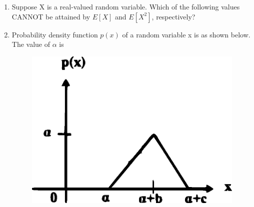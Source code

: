 \begin{enumerate}[label=\thesection.\arabic*.,ref=\thesection.\theenumi]
\begin{enumerate}
\end{enumerate}
\solution



\item Suppose X is a real-valued random variable. Which of the following values CANNOT be attained by $E[X]$ and $E[X^2]$, respectively?

\begin{enumerate}
\end{enumerate}
\solution


\item Probability density function $p(x)$ of a random variable x is as shown below. The value of $\alpha$ is 

\begin{figure}[!h]
\includegraphics[width=\columnwidth]{./figs/figure13.eps}
\caption{}
\label{fig:13}
\end{figure}


\begin{enumerate}
\end{enumerate}
\end{enumerate}
